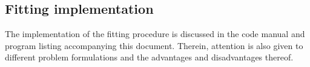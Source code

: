 \subsection{Fitting implementation}
The implementation of the fitting procedure is discussed in the code manual and program listing accompanying this document.
Therein, attention is also given to different problem formulations and the advantages and disadvantages thereof.

